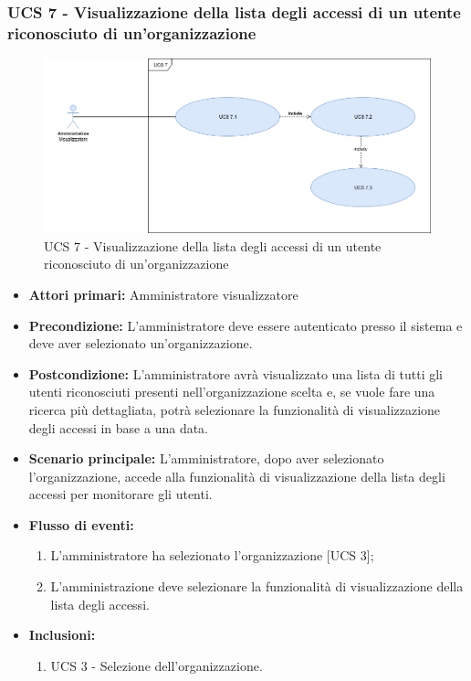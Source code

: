 
\subsubsection{UCS 7 - Visualizzazione della lista degli accessi di un utente riconosciuto di un'organizzazione}

\begin{figure}[h]
	\centering
	\includegraphics[scale=0.3]{sezioni/UseCase/Immagini/UCS7.png}
	\caption{UCS 7 - Visualizzazione della lista degli accessi di un utente riconosciuto di un'organizzazione}
\end{figure}

\begin{itemize}
\item \textbf{Attori primari:} Amministratore visualizzatore
\item \textbf{Precondizione:} L'amministratore deve essere autenticato presso il sistema e deve aver selezionato un'organizzazione.
\item \textbf{Postcondizione:} L'amministratore avrà visualizzato una lista di tutti gli utenti riconosciuti presenti nell'organizzazione scelta e, se vuole fare una ricerca più dettagliata, potrà selezionare la funzionalità di visualizzazione degli accessi in base a una data.
\item \textbf{Scenario principale:} L'amministratore, dopo aver selezionato l'organizzazione, accede alla funzionalità di visualizzazione della lista degli accessi per monitorare gli utenti.
\item \textbf{Flusso di eventi:} 
\begin{enumerate}
	\item L'amministratore ha selezionato l'organizzazione [UCS 3];
	\item L'amministrazione deve selezionare la funzionalità di visualizzazione della lista degli accessi.
\end{enumerate}
\item \textbf{Inclusioni:}
\begin{enumerate}
	\item UCS 3 - Selezione dell'organizzazione.
\end{enumerate}
\end{itemize}

